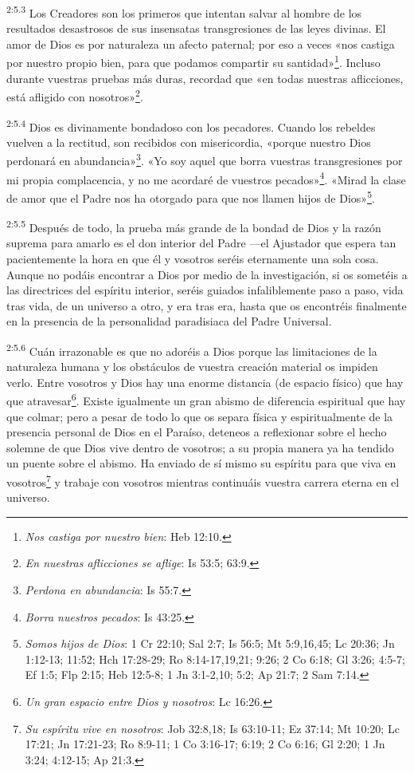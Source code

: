\par
\textsuperscript{2:5.3} Los Creadores son los primeros que intentan salvar al hombre de los resultados desastrosos de sus insensatas transgresiones de las leyes divinas. El amor de Dios es por naturaleza un afecto paternal; por eso a veces «nos castiga por nuestro propio bien, para que podamos compartir su santidad»\footnote{\textit{Nos castiga por nuestro bien}: Heb 12:10.}. Incluso durante vuestras pruebas más duras, recordad que «en todas nuestras aflicciones, está afligido con nosotros»\footnote{\textit{En nuestras aflicciones se aflige}: Is 53:5; 63:9.}.

\par
\textsuperscript{2:5.4} Dios es divinamente bondadoso con los pecadores. Cuando los rebeldes vuelven a la rectitud, son recibidos con misericordia, «porque nuestro Dios perdonará en abundancia»\footnote{\textit{Perdona en abundancia}: Is 55:7.}. «Yo soy aquel que borra vuestras transgresiones por mi propia complacencia, y no me acordaré de vuestros pecados»\footnote{\textit{Borra nuestros pecados}: Is 43:25.}. «Mirad la clase de amor que el Padre nos ha otorgado para que nos llamen hijos de Dios»\footnote{\textit{Somos hijos de Dios}: 1 Cr 22:10; Sal 2:7; Is 56:5; Mt 5:9,16,45; Lc 20:36; Jn 1:12-13; 11:52; Hch 17:28-29; Ro 8:14-17,19,21; 9:26; 2 Co 6:18; Gl 3:26; 4:5-7; Ef 1:5; Flp 2:15; Heb 12:5-8; 1 Jn 3:1-2,10; 5:2; Ap 21:7; 2 Sam 7:14.}.

\par
\textsuperscript{2:5.5} Después de todo, la prueba más grande de la bondad de Dios y la razón suprema para amarlo es el don interior del Padre ---el Ajustador que espera tan pacientemente la hora en que él y vosotros seréis eternamente una sola cosa. Aunque no podáis encontrar a Dios por medio de la investigación, si os sometéis a las directrices del espíritu interior, seréis guiados infaliblemente paso a paso, vida tras vida, de un universo a otro, y era tras era, hasta que os encontréis finalmente en la presencia de la personalidad paradisiaca del Padre Universal.

\par
\textsuperscript{2:5.6} Cuán irrazonable es que no adoréis a Dios porque las limitaciones de la naturaleza humana y los obstáculos de vuestra creación material os impiden verlo. Entre vosotros y Dios hay una enorme distancia (de espacio físico) que hay que atravesar\footnote{\textit{Un gran espacio entre Dios y nosotros}: Lc 16:26.}. Existe igualmente un gran abismo de diferencia espiritual que hay que colmar; pero a pesar de todo lo que os separa física y espiritualmente de la presencia personal de Dios en el Paraíso, deteneos a reflexionar sobre el hecho solemne de que Dios vive dentro de vosotros; a su propia manera ya ha tendido un puente sobre el abismo. Ha enviado de sí mismo su espíritu para que viva en vosotros\footnote{\textit{Su espíritu vive en nosotros}: Job 32:8,18; Is 63:10-11; Ez 37:14; Mt 10:20; Lc 17:21; Jn 17:21-23; Ro 8:9-11; 1 Co 3:16-17; 6:19; 2 Co 6:16; Gl 2:20; 1 Jn 3:24; 4:12-15; Ap 21:3.} y trabaje con vosotros mientras continuáis vuestra carrera eterna en el universo.

